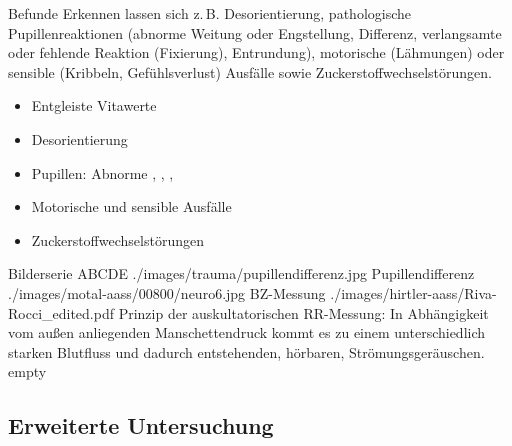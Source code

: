 {{\eye} Befunde}
{Erkennen lassen sich z.\,B.  Desorientierung, pathologische
Pupillenreaktionen (abnorme Weitung oder Engstellung,
Differenz, verlangsamte oder fehlende Reaktion (Fixierung),
Entrundung), motorische (Lähmungen) oder sensible (Kribbeln,
Gefühlsverlust) Ausfälle sowie Zuckerstoffwechselstörungen.
}
{
\begin{itemize}
  \item[\eye] Entgleiste Vitawerte
  \item[\eye] Desorientierung
  \item[\eye] Pupillen: Abnorme , ,
  , 
  \item[\eye] Motorische und sensible Ausfälle
  \item[\eye] Zuckerstoffwechselstörungen
\end{itemize}
}
{}
{}
{}

\begin{PictureSeriesWide}{}{Bilderserie ABCDE}
{./images/trauma/pupillendifferenz.jpg}
{Pupillendifferenz}
{./images/motal-aass/00800/neuro6.jpg}
{BZ-Messung }
{./images/hirtler-aass/Riva-Rocci_edited.pdf}
{Prinzip
    der auskultatorischen RR-Messung: In Abhängigkeit vom
    außen anliegenden Manschettendruck kommt es zu einem
    unterschiedlich starken Blutfluss und dadurch
    entstehenden, hörbaren, Strömungsgeräuschen.}
{empty}
{}
\end{PictureSeriesWide}

\clearpage
\subsection{{} Erweiterte Untersuchung}

